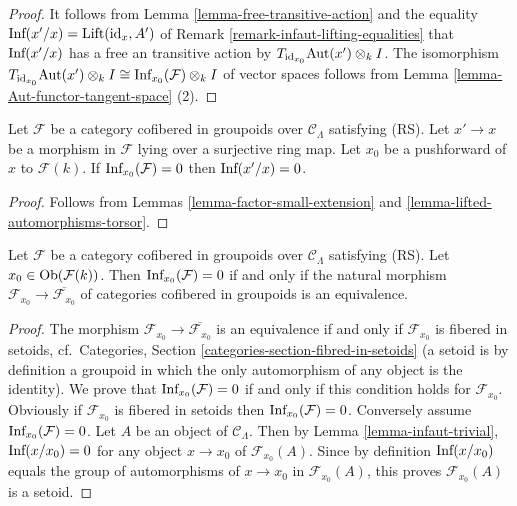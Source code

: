 \begin{proof}
It follows from Lemma \ref{lemma-free-transitive-action} and the equality 
$\textnormal{Inf}(x'/x) = \textnormal{Lift}(\textnormal{id}_{x}, A')$ of Remark 
\ref{remark-infaut-lifting-equalities} that $\textnormal{Inf}(x'/x)$ has a free 
an transitive action by $T_{\textnormal{id}_{x_0}} \textnormal{Aut}(x') 
\otimes_{k} I$.  The isomorphism $T_{\textnormal{id}_{x_0}} 
\textnormal{Aut}(x') \otimes_{k} I \cong \textnormal{Inf}_{x_0}(\mathcal F) 
\otimes_{k} I$ of vector spaces follows from Lemma 
\ref{lemma-Aut-functor-tangent-space} (2).
\end{proof}

\begin{lemma}
\label{lemma-infaut-trivial}
Let $\mathcal F$ be a category cofibered in groupoids over $\mathcal 
C_{\Lambda}$ satisfying \textnormal{(RS)}. Let $x' \rightarrow x$ be a morphism 
in $\mathcal F$ lying over a surjective ring map.  Let $x_0$ be a pushforward 
of $x$ to $\mathcal F(k)$.  If $\textnormal{Inf}_{x_0}(\mathcal F) = 0$ then 
$\textnormal{Inf}(x'/x) = 0$.
\end{lemma}

\begin{proof}
Follows from Lemmas \ref{lemma-factor-small-extension} and 
\ref{lemma-lifted-automorphisms-torsor}.
\end{proof}

\begin{lemma}
\label{lemma-infdef-trivial}
Let $\mathcal F$ be a category cofibered in groupoids over $\mathcal 
C_{\Lambda}$ satisfying (RS). Let $x_0 \in \textnormal{Ob}(\mathcal F(k))$. 
Then $\textnormal{Inf}_{x_0}(\mathcal F) = 0$ if and only if the natural 
morphism $\mathcal F_{x_0} \rightarrow \overline{\mathcal F_{x_0}}$ of 
categories cofibered in groupoids is an equivalence.
\end{lemma}

\begin{proof}
The morphism $\mathcal F_{x_0} \rightarrow \overline{\mathcal F_{x_0}}$ is an 
equivalence if and only if $\mathcal F_{x_0}$ is fibered in setoids,
cf.\ Categories, Section \ref{categories-section-fibred-in-setoids}
(a setoid is by definition a groupoid in 
which the only automorphism of any object is the identity).  We prove that 
$\textnormal{Inf}_{x_0}(\mathcal F) = 0$ if and only if this condition holds 
for $\mathcal F_{x_0}$.  Obviously if $\mathcal F_{x_0}$ is fibered in setoids 
then $\textnormal{Inf}_{x_0}(\mathcal F) = 0$.  Conversely assume 
$\textnormal{Inf}_{x_0}(\mathcal F) = 0$.  Let $A$ be an object of $\mathcal 
C_{\Lambda}$. Then by Lemma \ref{lemma-infaut-trivial}, 
$\textnormal{Inf}(x/x_0) = 0$ for any object $x \rightarrow x_0$ of $\mathcal 
F_{x_0}(A)$. Since by definition $\textnormal{Inf}(x/x_0)$ equals the group of 
automorphisms of $x \rightarrow x_0$ in $\mathcal F_{x_0}(A)$, this proves 
$\mathcal F_{x_0}(A)$ is a setoid.
\end{proof}


